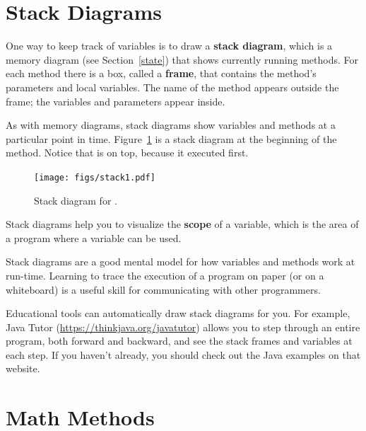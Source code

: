 \section{Stack Diagrams}
\label{stack}


One way to keep track of variables is to draw a {\bf stack diagram}, which is a memory diagram (see Section~\ref{state}) that shows currently running methods.
For each method there is a box, called a {\bf frame}, that contains the method's parameters and local variables.
The name of the method appears outside the frame; the variables and parameters appear inside.

As with memory diagrams, stack diagrams show variables and methods at a particular point in time.
Figure~\ref{fig.stack} is a stack diagram at the beginning of the  method.
Notice that  is on top, because it executed first.

\begin{figure}[!ht]
\begin{center}
\texttt{[image: figs/stack1.pdf]}
\caption{Stack diagram for .}
\label{fig.stack}
\end{center}
\end{figure}


Stack diagrams help you to visualize the {\bf scope} of a variable, which is the area of a program where a variable can be used.


Stack diagrams are a good mental model for how variables and methods work at run-time.
Learning to trace the execution of a program on paper (or on a whiteboard) is a useful skill for communicating with other programmers.

Educational tools can automatically draw stack diagrams for you.
For example, Java Tutor (\url{https://thinkjava.org/javatutor}) allows you to step through an entire program, both forward and backward, and see the stack frames and variables at each step.
If you haven't already, you should check out the Java examples on that website.



\section{Math Methods}
\label{mathmeth}

